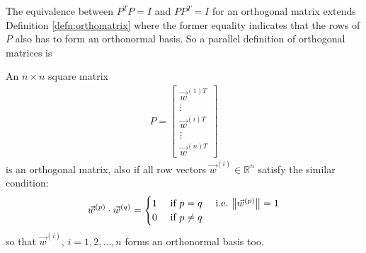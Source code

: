 The equivalence between $P^TP=I$ and $PP^T = I$ for an orthogonal matrix extends Definition \ref{defn:orthomatrix} where the former equality indicates that the rows of $P$ also has to form an orthonormal basis. So a parallel definition of orthogonal matrices is
\begin{defn}
An $n \times n$ square matrix
\begin{align*}
P = \left[
\begin{array}{c}
\vec{w}^{(1)T}\\
\hline
\vdots \\
\hline
\vec{w}^{(i)T} \\
\hline
\vdots \\
\hline
\vec{w}^{(n)T}  
\end{array}
\right]
\end{align*}
is an orthogonal matrix, also if all row vectors $\vec{w}^{(i)} \in \mathbb{R}^n$ satisfy the similar condition:
\begin{align*}
\vec{w}^{(p)} \cdot \vec{w}^{(q)} =
\begin{cases}
1 &\text{ if } p = q \quad \text{ i.e.\ } \norm{\vec{w}^{(p)}} = 1 \\
0 &\text{ if } p \neq q    
\end{cases}
\end{align*}
so that $\vec{w}^{(i)}$, $i=1,2,\ldots,n$ forms an orthonormal basis too.
\end{defn}


